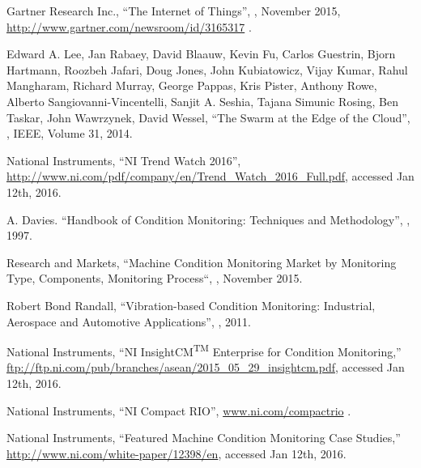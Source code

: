 
\begin{thebibliography}{10}

Gartner Research Inc., ``The Internet of Things'',
, November 2015, \url{http://www.gartner.com/newsroom/id/3165317} .

Edward A. Lee, Jan Rabaey, David Blaauw, Kevin Fu, Carlos Guestrin, Bjorn Hartmann, Roozbeh Jafari, Doug Jones, John Kubiatowicz, Vijay Kumar, Rahul Mangharam, Richard Murray, George Pappas, Kris Pister, Anthony Rowe, Alberto Sangiovanni-Vincentelli, Sanjit A. Seshia, Tajana Simunic Rosing, Ben Taskar, John Wawrzynek, David Wessel, ``The Swarm at the Edge of the Cloud'',
, IEEE, Volume 31, 2014.

National Instruments, ``NI Trend Watch 2016'',
\url{http://www.ni.com/pdf/company/en/Trend_Watch_2016_Full.pdf}, accessed Jan 12th, 2016.

A. Davies. ``Handbook of Condition Monitoring: Techniques and Methodology'',
, 1997.

Research and Markets, ``Machine Condition Monitoring Market by Monitoring Type, Components, Monitoring Process``,
,
November 2015.


Robert Bond Randall, 
``Vibration-based Condition Monitoring: Industrial, Aerospace and Automotive Applications'', 
, 2011.

National Instruments, ``NI InsightCM\textsuperscript{TM} Enterprise for Condition Monitoring,''
\url{ftp://ftp.ni.com/pub/branches/asean/2015_05_29_insightcm.pdf}, accessed Jan 12th, 2016.

National Instruments, ``NI Compact RIO'', \url{www.ni.com/compactrio} .

National Instruments, ``Featured Machine Condition Monitoring Case Studies,'' \url{http://www.ni.com/white-paper/12398/en}, accessed Jan 12th, 2016.


\end{thebibliography}

